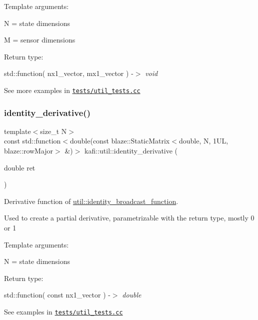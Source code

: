 Template arguments\+:
\begin{DoxyItemize}
\item {\ttfamily N} = state dimensions
\item {\ttfamily M} = sensor dimensions
\end{DoxyItemize}

Return type\+:
\begin{DoxyItemize}
\item std\+::function( {\ttfamily nx1\+\_\+vector}, {\ttfamily mx1\+\_\+vector} ) -\/$>$ {\itshape void}
\end{DoxyItemize}

See more examples in \href{../../tests/util_tests.cc}{\tt tests/util\+\_\+tests.\+cc} \mbox{\label{namespacekafi_1_1util_af5c6d0524f5bd84aaaa74a1a1cc5512a}} 
\subsubsection{\texorpdfstring{identity\+\_\+derivative()}{identity\_derivative()}}
{\footnotesize\ttfamily template$<$size\+\_\+t N$>$ \\
const std\+::function$<$double(const blaze\+::\+Static\+Matrix$<$double, N, 1\+U\+L, blaze\+::row\+Major$>$ \&)$>$ kafi\+::util\+::identity\+\_\+derivative (\begin{DoxyParamCaption}\item[{double}]{ret }\end{DoxyParamCaption})}



Derivative function of \hyperlink{namespacekafi_1_1util_a9a257c47aefec8bf7538ab2ee5c4027d}{util\+::identity\+\_\+broadcast\+\_\+function}. 

Used to create a partial derivative, parametrizable with the return type, mostly 0 or 1

Template arguments\+:
\begin{DoxyItemize}
\item {\ttfamily N} = state dimensions
\end{DoxyItemize}

Return type\+:
\begin{DoxyItemize}
\item std\+::function( {\ttfamily const nx1\+\_\+vector} ) -\/$>$ {\itshape double}
\end{DoxyItemize}

See examples in \href{../../tests/util_tests.cc}{\tt tests/util\+\_\+tests.\+cc} 